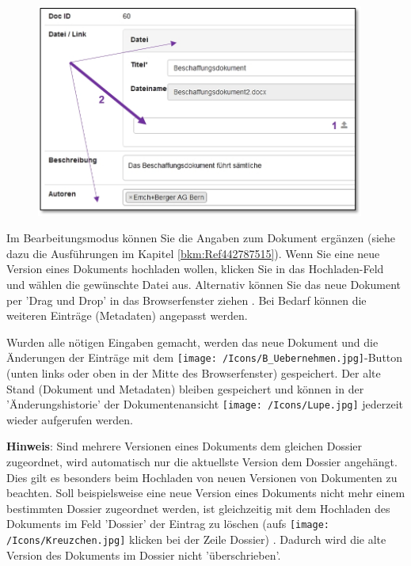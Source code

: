 \begin{figure}
\vspace{-10pt}
\includegraphics[height=70mm]{../chapters/11_Dokumentenablage/pictures/11-2-5_NeuesDokuHochladen.jpg}
\end{figure}
Im Bearbeitungsmodus können Sie die Angaben zum Dokument ergänzen (siehe dazu die Ausführungen im Kapitel \ref{bkm:Ref442787515}). Wenn Sie eine neue Version eines Dokuments hochladen wollen, klicken Sie in das Hochladen-Feld  und wählen die gewünschte Datei aus. Alternativ können Sie das neue Dokument per 'Drag und Drop' in das Browserfenster ziehen . Bei Bedarf können die weiteren Einträge (Metadaten) angepasst werden.

\vspace{\baselineskip}

Wurden alle nötigen Eingaben gemacht, werden das neue Dokument und die Änderungen der Einträge mit dem \texttt{[image: /Icons/B\_Uebernehmen.jpg]}-Button (unten links oder oben in der Mitte des Browserfenster) gespeichert. Der alte Stand (Dokument und Metadaten) bleiben gespeichert und können in der 'Änderungshistorie' der Dokumentenansicht \texttt{[image: /Icons/Lupe.jpg]} jederzeit wieder aufgerufen werden.

\vspace{\baselineskip}
\vspace{\baselineskip}

\textbf{Hinweis}: Sind mehrere Versionen eines Dokuments dem gleichen Dossier zugeordnet, wird automatisch nur die aktuellste Version dem Dossier angehängt. Dies gilt es besonders beim Hochladen von neuen Versionen von Dokumenten zu beachten. Soll beispielsweise eine neue Version eines Dokuments nicht mehr einem bestimmten Dossier zugeordnet werden, ist gleichzeitig mit dem Hochladen des Dokuments im Feld 'Dossier' der Eintrag zu löschen (aufs \texttt{[image: /Icons/Kreuzchen.jpg]} klicken bei der Zeile Dossier) . Dadurch wird die alte Version des Dokuments im Dossier nicht 'überschrieben'.

